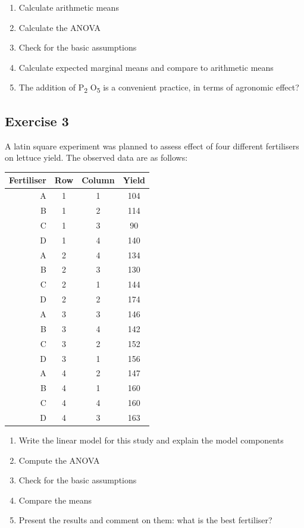 \documentclass[a4paper,12pt,oneside]{book}
\providecommand{\tightlist}{%
  \setlength{\itemsep}{0pt}\setlength{\parskip}{0pt}}
\begin{document}
\begin{enumerate}
\def\labelenumi{\arabic{enumi}.}
\tightlist
\item
  Calculate arithmetic means
\item
  Calculate the ANOVA
\item
  Check for the basic assumptions
\item
  Calculate expected marginal means and compare to arithmetic means
\item
  The addition of P\textsubscript{2} O\textsubscript{5} is a convenient practice, in terms of agronomic effect?
\end{enumerate}

\hypertarget{exercise-3-5}{%
\subsection{Exercise 3}\label{exercise-3-5}}

A latin square experiment was planned to assess effect of four different fertilisers on lettuce yield. The observed data are as follows:

\begin{longtable}[]{@{}rccc@{}}
\toprule
Fertiliser & Row & Column & Yield \\
\midrule
\endhead
A & 1 & 1 & 104 \\
B & 1 & 2 & 114 \\
C & 1 & 3 & 90 \\
D & 1 & 4 & 140 \\
A & 2 & 4 & 134 \\
B & 2 & 3 & 130 \\
C & 2 & 1 & 144 \\
D & 2 & 2 & 174 \\
A & 3 & 3 & 146 \\
B & 3 & 4 & 142 \\
C & 3 & 2 & 152 \\
D & 3 & 1 & 156 \\
A & 4 & 2 & 147 \\
B & 4 & 1 & 160 \\
C & 4 & 4 & 160 \\
D & 4 & 3 & 163 \\
\bottomrule
\end{longtable}

\begin{enumerate}
\def\labelenumi{\arabic{enumi}.}
\tightlist
\item
  Write the linear model for this study and explain the model components
\item
  Compute the ANOVA
\item
  Check for the basic assumptions
\item
  Compare the means
\item
  Present the results and comment on them: what is the best fertiliser?
\end{enumerate}
\end{document}
